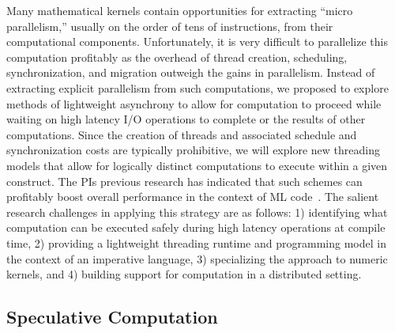\documentclass[12pt]{article}
\begin{document}
Many mathematical kernels contain opportunities for extracting ``micro parallelism,''
usually on the order of tens of instructions, from their computational components. 
Unfortunately, it is very difficult to parallelize this computation profitably as
the overhead of thread creation, scheduling, synchronization, and migration outweigh
the gains in parallelism. Instead of extracting explicit parallelism from such
computations, we proposed to explore methods of lightweight asynchrony to allow for
computation to proceed while waiting on high latency I/O operations to complete or
the results of other computations. Since the creation of threads and associated
schedule and synchronization costs are typically prohibitive, we will explore new
threading models that allow for logically distinct computations to execute within
a given construct. The PIs previous research has indicated that such schemes can profitably
boost overall performance in the context of ML code~\cite{acml, parasites}. The salient research
challenges in applying this strategy are as follows:  1) identifying what computation can be executed
safely during high latency operations at compile time, 2) providing a lightweight threading runtime
and programming model in the context of an imperative language, 
3) specializing the approach to numeric kernels,
and 4) building support for computation in a distributed setting.

\subsection{Speculative Computation}
\end{document}
